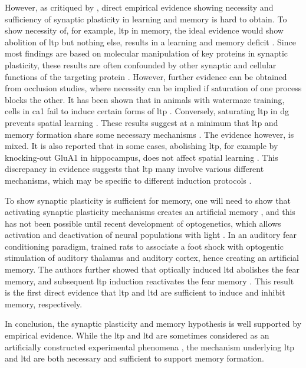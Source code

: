 However, as critiqued by \citet{neves08}, direct empirical evidence showing necessity and sufficiency of synaptic plasticity in learning and memory is hard to obtain. To show necessity of, for example, \gls{ltp} in memory, the ideal evidence would show abolition of \gls{ltp} but nothing else, results in a learning and memory deficit \citep{neves08}. Since most findings are based on molecular manipulation of key proteins in synaptic plasticity, these results are often confounded by other synaptic and cellular functions of the targeting protein \citep{neves08}. However, further evidence can be obtained from occlusion studies, where necessity can be implied if saturation of one process blocks the other. It has been shown that in animals with watermaze  training, cells in \gls{ca1} fail to induce certain forms of \gls{ltp} \citep{habib14}. Conversely, saturating \gls{ltp} in \gls{dg} prevents spatial learning \citep{moser98}. These results suggest at a minimum that \gls{ltp} and memory formation share some necessary mechanisms \citep{takeuchi14}. The evidence however, is mixed. It is also reported that in some cases, abolishing \gls{ltp}, for example by knocking-out GluA1 in hippocampus, does not affect spatial learning \citep{zamanillo99}. This discrepancy in evidence suggests that \gls{ltp} many involve various different mechanisms, which may be specific to different induction protocols \citep{neves08}.

To show synaptic plasticity is sufficient for memory, one will need to show that activating synaptic plasticity mechanisms creates an artificial memory \citep{neves08}, and this has not been possible until recent development of optogenetics, which allows activation and deactivation of neural populations with light  \citep{zhang07, rajasethupathy16}. In an auditory fear conditioning paradigm, \citet{nabavi14} trained rats to associate a foot shock with optogentic stimulation of auditory thalamus and auditory cortex, hence creating an artificial memory. The authors further showed that optically induced \gls{ltd} abolishes the fear memory, and subsequent \gls{ltp} induction reactivates the fear memory \citep{nabavi14}. This result is the first direct evidence that \gls{ltp} and \gls{ltd} are sufficient to induce and inhibit memory, respectively. 

In conclusion, the synaptic plasticity and memory hypothesis is well supported by empirical evidence. While the \gls{ltp} and \gls{ltd} are sometimes considered as an artificially constructed experimental phenomena \citep{stevens98}, the mechanism underlying \gls{ltp} and \gls{ltd} are both necessary and sufficient to support memory formation.

